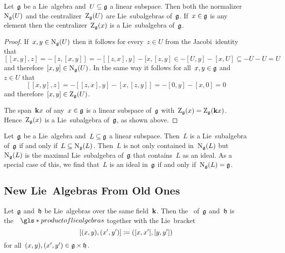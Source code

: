 \begin{lemma}
 Let~$\mathfrak{g}$ be a Lie~algebra and~$U \subseteq \mathfrak{g}$ a linear subspace.
 Then both the normalizer~$\operatorname{N}_{\mathfrak{g}}(U)$ and the centralizer~$\operatorname{Z}_{\mathfrak{g}}(U)$ are Lie~subalgebras of~$\mathfrak{g}$.
 If~$x \in \mathfrak{g}$ is any element then the centralizer~$\operatorname{Z}_{\mathfrak{g}}(x)$ is a Lie~subalgebra of~$\mathfrak{g}$.
\end{lemma}


\begin{proof}
 If~$x, y \in \operatorname{N}_{\mathfrak{g}}(U)$ then it follows for every~$z \in U$ from the Jacobi~identity that
 \[
  [[x,y], z]
  =
  - [z, [x,y]]
  =
  - [[z,x], y] - [x, [z,y]
  \in
  - [U, y] - [x, U]
  \subseteq
  - U - U
  =
  U
 \]
 and therefore~$[x,y] \in \operatorname{N}_{\mathfrak{g}}(U)$.
 In the same way it follows for all~$x, y \in \mathfrak{g}$ and~$z \in U$ that
 \[
  [[x,y], z]
  =
  - [[z,x], y] - [x, [z,y]]
  =
  - [0, y] - [x, 0]
  =
  0
 \]
 and therefore~$[x,y] \in \operatorname{Z}_{\mathfrak{g}}(U)$.
 
 The span~$\mathbf{k} x$ of any~$x \in \mathfrak{g}$ is a linear subspace of~$\mathfrak{g}$ with~$\operatorname{Z}_{\mathfrak{g}}(x) = \operatorname{Z}_{\mathfrak{g}}(\mathbf{k} x)$.
 Hence~$\operatorname{Z}_{\mathfrak{g}}(x)$ is a Lie~subalgebra of~$\mathfrak{g}$, as shown above.
\end{proof}


\begin{remark}
 Let~$\mathfrak{g}$ be a Lie~algebra and~$L \subseteq \mathfrak{g}$ a linear subspace.
 Then~$L$ is a Lie~subalgebra of~$\mathfrak{g}$ if and only if~$L \subseteq \operatorname{N}_{\mathfrak{g}}(L)$.
 Then~$L$ is not only contained in~$\operatorname{N}_{\mathfrak{g}}(L)$ but~$\operatorname{N}_{\mathfrak{g}}(L)$ is the maximal Lie~subalgebra of~$\mathfrak{g}$ that contains~$L$ as an ideal.
 As a special case of this, we find that~$L$ is an ideal in~$\mathfrak{g}$ if and only if~$\operatorname{N}_{\mathfrak{g}}(L) = \mathfrak{g}$.
\end{remark}





\subsection{New Lie~Algebras From Old Ones}


\begin{definition}
  Let~$\mathfrak{g}$ and~$\mathfrak{h}$ be Lie~algebras over the same field~$\kf$.
  Then the \, of~$\mathfrak{g}$ and~$\mathfrak{h}$ is the~{\vectorspace{$\kf$}}~$\gls*{product of lie algebras}$ together with the Lie~bracket
  \[
    [(x,y), (x',y')]
    \coloneqq
    ([x, x'], [y, y'])
  \]
  for all~$(x,y), (x',y') \in \mathfrak{g} \times \mathfrak{h}$.
\end{definition}


